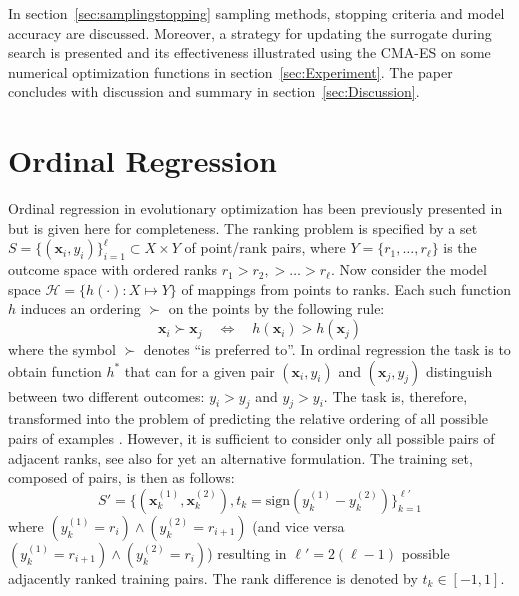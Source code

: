 \documentclass[conference]{IEEEtran}
\renewcommand{\vec}[1]{{\mbox{\boldmath$#1$}}}
\renewcommand{\vec}[1]{{\mathbf #1}}
\begin{document}
In section~\ref{sec:samplingstopping} sampling methods, stopping criteria and model accuracy are discussed. Moreover, a strategy for updating the surrogate during search is presented and its effectiveness illustrated using the CMA-ES \cite{hansen:ostermeier:01} on some numerical optimization functions in section~\ref{sec:Experiment}. The paper concludes with discussion and summary in section~\ref{sec:Discussion}.


\section{Ordinal Regression}\label{sec:OR}
Ordinal regression in evolutionary optimization has been previously presented in \cite{Ru06:PPSN} but is given here for completeness. 
The ranking problem is specified by a set $S = \{(\vec{x}_i,y_i)\}_{i=1}^\ell \subset X \times Y$ of point/rank pairs, where $Y=\{r_1,\ldots,r_\ell\}$ is the outcome space with ordered ranks $r_1> r_2,> \ldots > r_\ell$.   Now consider the model space $\mathcal{H} = \{h(\cdot) : X \mapsto Y\}$ of mappings from points to ranks. Each such function $h$ induces an ordering $\succ$ on the points by the following rule:
\begin{equation}
\vec{x}_i \succ \vec{x}_j \quad \Leftrightarrow \quad h(\vec{x}_i) > h(\vec{x}_j)
\end{equation}
where the symbol $\succ$ denotes ``is preferred to''.  In ordinal regression the task is to obtain function $h^*$ that can for a given pair $(\vec{x}_i,y_i)$ and $(\vec{x}_j,y_j)$ distinguish between two different outcomes: $y_i > y_j$ and $y_j > y_i$. The task is, therefore, transformed into the problem of predicting the relative ordering of all possible pairs of examples \cite{Herbrich00,joachims02}.  However, it is sufficient to consider only all possible pairs of adjacent ranks, see also \cite{shawe-taylor04:book} for yet an alternative formulation.  The training set, composed of pairs, is then as follows:
$$S' = \big\{(\vec{x}_k^{(1)}, \vec{x}_k^{(2)}),t_k=\text{sign}(y_k^{(1)} - y_k^{(2)})\big\}_{k=1}^{\ell'}$$
where $(y_k^{(1)} = r_i) \wedge (y_k^{(2)} = r_{i+1})$ (and vice versa $(y_k^{(1)} = r_{i+1}) \wedge (y_k^{(2)} = r_{i})$) resulting in $\ell'=2(\ell-1)$ possible adjacently ranked training pairs. The rank difference is denoted by $t_k\in[-1,1]$.
\end{document}
